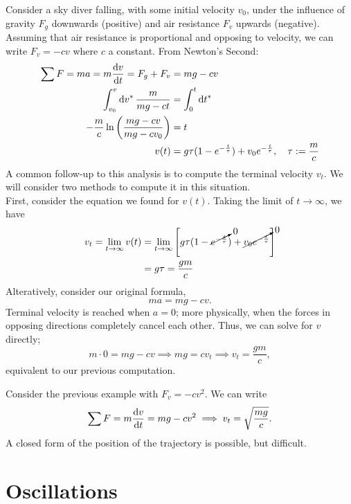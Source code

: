 \documentclass[12pt]{article}
\begin{document}
\begin{example}
  Consider a sky diver falling, with some initial velocity $v_0$, under the influence of gravity $F_g$ downwards (positive) and air resistance $F_v$ upwards (negative). Assuming that air resistance is proportional and opposing to velocity, we can write $F_v = - cv$ where $c$ a constant. From Newton's Second:
  \begin{align*}
    \sum F = ma = m \dv{v}{t} = F_g + F_v &= mg - cv\\
  \int_{v_0}^v \dd{v^*} \frac{m}{mg - ct} &= \int_0^t \dd{t^*}\\
  -\frac{m}{c}\ln\left(\frac{mg - cv}{mg - cv_0}\right)  &= t\\
  v(t) &= g \tau (1-e^{-\frac{t}{\tau}}) + v_0e^{-\frac{t}{\tau}}, \quad \tau := \frac{m}{c}
  \end{align*}
  A common follow-up to this analysis is to compute the terminal velocity $v_t$. We will consider two methods to compute it in this situation.\\
  First, consider the equation we found for $v(t)$. Taking the limit of $t \to \infty$, we have
  \begin{align*}
    v_t = \lim_{t \to \infty} v(t) &= \lim_{t \to \infty} \left[g \tau (1 -\cancelto{0}{e^{- \frac{t}{\tau}}}) + \cancelto{0}{v_0 e^{-\frac{t}{\tau}}}\right]\\
    &= g\tau = \frac{gm}{c}
  \end{align*}
  Alteratively, consider our original formula,\[ma = mg - cv.\] Terminal velocity is reached when $a = 0$; more physically, when the forces in opposing directions completely cancel each other. Thus, we can solve for $v$ directly;
  \[m\cdot 0 = mg - cv \implies mg = c v_t \implies v_t = \frac{gm}{c},\] equivalent to our previous computation.
\end{example}

\begin{example}
  Consider the previous example with $F_v = -c v^2$. We can write \[\sum F = m \dv{v}{t} = mg -cv^2 \implies v_t = \sqrt{\frac{mg}{c}}.\] A closed form of the position of the trajectory is possible, but difficult.
\end{example}

\section{Oscillations}
 
\end{document}
